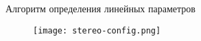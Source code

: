 \begin{frame}{Алгоритм определения линейных параметров}
\begin{figure}
    \centering
    \texttt{[image: stereo-config.png]}
\end{figure}
\end{frame}